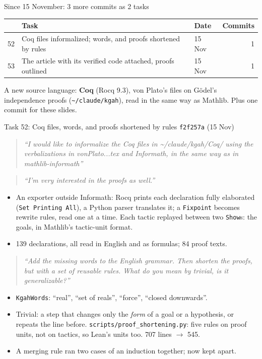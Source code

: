 \documentclass[10pt,aspectratio=169]{beamer}
\newcommand{\bad}[1]{\textcolor{warn}{#1}}
\newcommand{\ok}[1]{\textcolor{good}{#1}}
\newcommand{\commit}[1]{\texttt{\footnotesize #1}}
\newcommand{\prompt}[1]{\begin{quote}\small\itshape ``#1''\end{quote}}
\begin{document}
\begin{frame}{Since 15 November: 3 more commits as 2 tasks}
  \footnotesize
  \begin{tabular}{rllr}
    \toprule
    & \textbf{Task} & \textbf{Date} & \textbf{Commits} \\
    \midrule
    52 & Coq files informalized; words, and proofs shortened by rules & 15 Nov & 1 \\
    53 & The article with its verified code attached, proofs outlined & 15 Nov & 1 \\
    \bottomrule
  \end{tabular}

  \vspace{0.5em}
  A new source language: \textbf{Coq} (Rocq 9.3), von Plato's files on Gödel's independence
  proofs (\texttt{\textasciitilde/claude/kgah}), read in the same way as Mathlib.
  Plus one commit for these slides.
\end{frame}

\begin{frame}{Task 52: Coq files, words, and proofs shortened by rules}
  \commit{f2f257a} (15 Nov)
  \prompt{I would like to informalize the Coq files in \textasciitilde/claude/kgah/Coq/ using the
  verbalizations in vonPlato...tex and Informath, in the same way as in mathlib-informath}
  \prompt{I'm very interested in the proofs as well.}
  \begin{itemize}\footnotesize
    \item An exporter outside Informath: Rocq prints each declaration fully elaborated
          (\texttt{Set Printing All}), a Python parser translates it; a \texttt{Fixpoint}
          becomes rewrite rules, read one at a time. Each tactic replayed between two
          \texttt{Show}s: the goals, in Mathlib's tactic-unit format.
    \item 139 declarations, all read in English and as formulas; 84 proof texts.
  \end{itemize}
  \prompt{Add the missing words to the English grammar. Then shorten the proofs, but with a set
  of reusable rules. What do you mean by trivial, is it generalizable?}
  \begin{itemize}\footnotesize
    \item \texttt{KgahWords}: ``real'', ``set of reals'', ``force'', ``closed downwards''.
    \item Trivial: a step that changes only the \emph{form} of a goal or a hypothesis, or
          repeats the line before. \texttt{scripts/proof\_shortening.py}: five rules on proof
          units, not on tactics, so Lean's units too. \ok{707 lines $\to$ 545}.
    \item A merging rule \bad{ran two cases of an induction together}; now kept apart.
  \end{itemize}
\end{frame}
\end{document}

